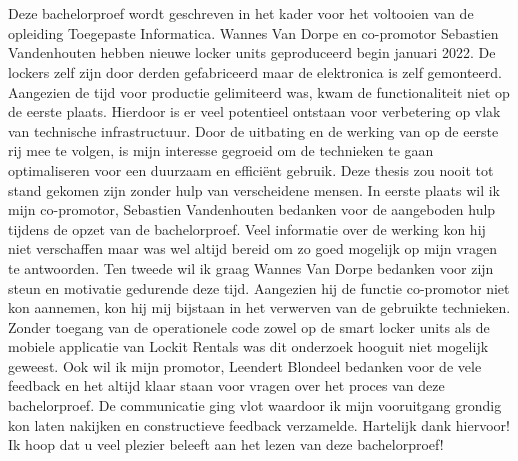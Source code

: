 
\chapter*{}%
\label{ch:voorwoord}


Deze bachelorproef wordt geschreven in het kader voor het voltooien van de opleiding Toegepaste Informatica. Wannes Van Dorpe en co-promotor Sebastien Vandenhouten hebben nieuwe locker units geproduceerd begin januari 2022. De lockers zelf zijn door derden gefabriceerd maar de elektronica is zelf gemonteerd. Aangezien de tijd voor productie gelimiteerd was, kwam de functionaliteit niet op de eerste plaats. Hierdoor is er veel potentieel ontstaan voor verbetering op vlak van technische infrastructuur. Door de uitbating en de werking van op de eerste rij mee te volgen, is mijn interesse gegroeid om de technieken te gaan optimaliseren voor een duurzaam en efficiënt gebruik.
\newline
\newline
Deze thesis zou nooit tot stand gekomen zijn zonder hulp van verscheidene mensen. In eerste plaats wil ik mijn co-promotor, Sebastien Vandenhouten bedanken voor de aangeboden hulp tijdens de opzet van de bachelorproef. Veel informatie over de werking kon hij niet verschaffen maar was wel altijd bereid om zo goed mogelijk op mijn vragen te antwoorden.
\newline
\newline
Ten tweede wil ik graag Wannes Van Dorpe bedanken voor zijn steun en motivatie gedurende deze tijd. Aangezien hij de functie co-promotor niet kon aannemen, kon hij mij bijstaan in het verwerven van de gebruikte technieken. Zonder toegang van de operationele code zowel op de smart locker units als de mobiele applicatie van Lockit Rentals was dit onderzoek hooguit niet mogelijk geweest. 
\newline
\newline
Ook wil ik mijn promotor, Leendert Blondeel bedanken voor de vele feedback en het altijd klaar staan voor vragen over het proces van deze bachelorproef. De communicatie ging vlot waardoor ik mijn vooruitgang grondig kon laten nakijken en constructieve feedback verzamelde. Hartelijk dank hiervoor!
\newline
\newline
Ik hoop dat u veel plezier beleeft aan het lezen van deze bachelorproef!
